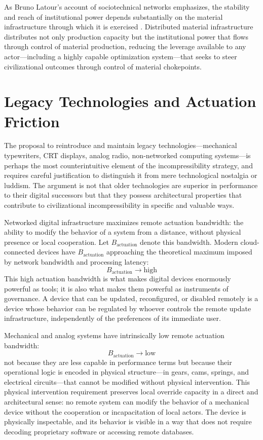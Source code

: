 \documentclass[12pt]{article}
\begin{document}
As Bruno Latour's account of sociotechnical networks emphasizes, the stability and reach of institutional power depends substantially on the material infrastructure through which it is exercised \citep{Latour2005}. Distributed material infrastructure distributes not only production capacity but the institutional power that flows through control of material production, reducing the leverage available to any actor---including a highly capable optimization system---that seeks to steer civilizational outcomes through control of material chokepoints.

\section{Legacy Technologies and Actuation Friction}

The proposal to reintroduce and maintain legacy technologies---mechanical typewriters, CRT displays, analog radio, non-networked computing systems---is perhaps the most counterintuitive element of the incompressibility strategy, and requires careful justification to distinguish it from mere technological nostalgia or luddism. The argument is not that older technologies are superior in performance to their digital successors but that they possess architectural properties that contribute to civilizational incompressibility in specific and valuable ways.

Networked digital infrastructure maximizes remote actuation bandwidth: the ability to modify the behavior of a system from a distance, without physical presence or local cooperation. Let $B_{\text{actuation}}$ denote this bandwidth. Modern cloud-connected devices have $B_{\text{actuation}}$ approaching the theoretical maximum imposed by network bandwidth and processing latency:
\[
B_{\text{actuation}} \to \text{high}
\]
This high actuation bandwidth is what makes digital devices enormously powerful as tools; it is also what makes them powerful as instruments of governance. A device that can be updated, reconfigured, or disabled remotely is a device whose behavior can be regulated by whoever controls the remote update infrastructure, independently of the preferences of its immediate user.

Mechanical and analog systems have intrinsically low remote actuation bandwidth:
\[
B_{\text{actuation}} \to \text{low}
\]
not because they are less capable in performance terms but because their operational logic is encoded in physical structure---in gears, cams, springs, and electrical circuits---that cannot be modified without physical intervention. This physical intervention requirement preserves local override capacity in a direct and architectural sense: no remote system can modify the behavior of a mechanical device without the cooperation or incapacitation of local actors. The device is physically inspectable, and its behavior is visible in a way that does not require decoding proprietary software or accessing remote databases.
\end{document}
